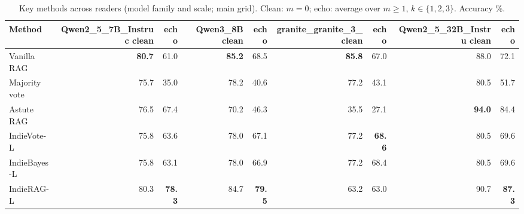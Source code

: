 \begin{table}[tbp]
\centering
\small
\caption{Key methods across readers (model family and scale; main grid). Clean: $m{=}0$; echo: average over $m\geq1$, $k\in\{1,2,3\}$. Accuracy \%.}
\label{tab:readers}
\setlength{\tabcolsep}{4pt}
\begin{tabular}{lrrrrrrrr}
\toprule
Method & Qwen2\_5\_7B\_Instruc clean & echo & Qwen3\_8B clean & echo & granite\_granite\_3\_ clean & echo & Qwen2\_5\_32B\_Instru clean & echo \\
\midrule
Vanilla RAG & \textbf{80.7} & 61.0 & \textbf{85.2} & 68.5 & \textbf{85.8} & 67.0 & 88.0 & 72.1 \\
Majority vote & 75.7 & 35.0 & 78.2 & 40.6 & 77.2 & 43.1 & 80.5 & 51.7 \\
Astute RAG & 76.5 & 67.4 & 70.2 & 46.3 & 35.5 & 27.1 & \textbf{94.0} & 84.4 \\
IndieVote-L & 75.8 & 63.6 & 78.0 & 67.1 & 77.2 & \textbf{68.6} & 80.5 & 69.6 \\
IndieBayes-L & 75.8 & 63.1 & 78.0 & 66.9 & 77.2 & 68.4 & 80.5 & 69.6 \\
IndieRAG-L & 80.3 & \textbf{78.3} & 84.7 & \textbf{79.5} & 63.2 & 63.0 & 90.7 & \textbf{87.3} \\
\bottomrule
\end{tabular}
\end{table}

